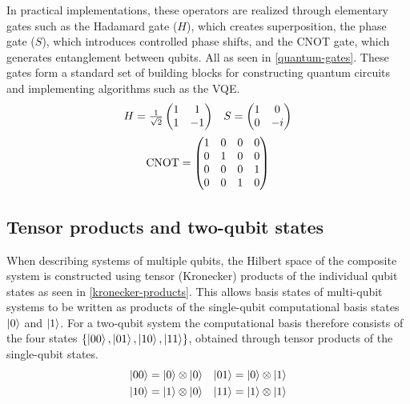 In practical implementations, these operators are realized through elementary gates such as the Hadamard gate ($H$), which creates superposition, the phase gate ($S$), which introduces controlled phase shifts, and the CNOT gate, which generates entanglement between qubits. All as seen in \cref{quantum-gates}. These gates form a standard set of building blocks for constructing quantum circuits and implementing algorithms such as the VQE.
\begin{equation}\label{quantum-gates}
\begin{array}{cc}
H = \frac{1}{\sqrt{2}}
\begin{pmatrix}
1 & 1\\
1 & -1
\end{pmatrix}
&
S =
\begin{pmatrix}
1 & 0\\
0 & -i
\end{pmatrix}
\\[12pt]
\multicolumn{2}{c}{
\text{CNOT} =
\begin{pmatrix}
1 & 0 & 0 & 0\\
0 & 1 & 0 & 0\\
0 & 0 & 0 & 1\\
0 & 0 & 1 & 0
\end{pmatrix}}
\end{array}
\end{equation}

\subsection{Tensor products and two-qubit states}
When describing systems of multiple qubits, the Hilbert space of the composite system is constructed using tensor (Kronecker) products of the individual qubit states as seen in \cref{kronecker-products}. This allows basis states of multi-qubit systems to be written as products of the single-qubit computational basis states $\left| 0 \right\rangle$ and $\left| 1 \right\rangle$. For a two-qubit system the computational basis therefore consists of the four states $\{\left| 00 \right\rangle,\left| 01 \right\rangle,\left| 10 \right\rangle,\left| 11 \right\rangle\}$, obtained through tensor products of the single-qubit states.
\begin{equation}\label{kronecker-products}
\begin{aligned}
\left| 00 \right\rangle &= \left| 0 \right\rangle \otimes \left| 0 \right\rangle &
\left| 01 \right\rangle &= \left| 0 \right\rangle \otimes \left| 1 \right\rangle \\
\left| 10 \right\rangle &= \left| 1 \right\rangle \otimes \left| 0 \right\rangle &
\left| 11 \right\rangle &= \left| 1 \right\rangle \otimes \left| 1 \right\rangle
\end{aligned}
\end{equation}


